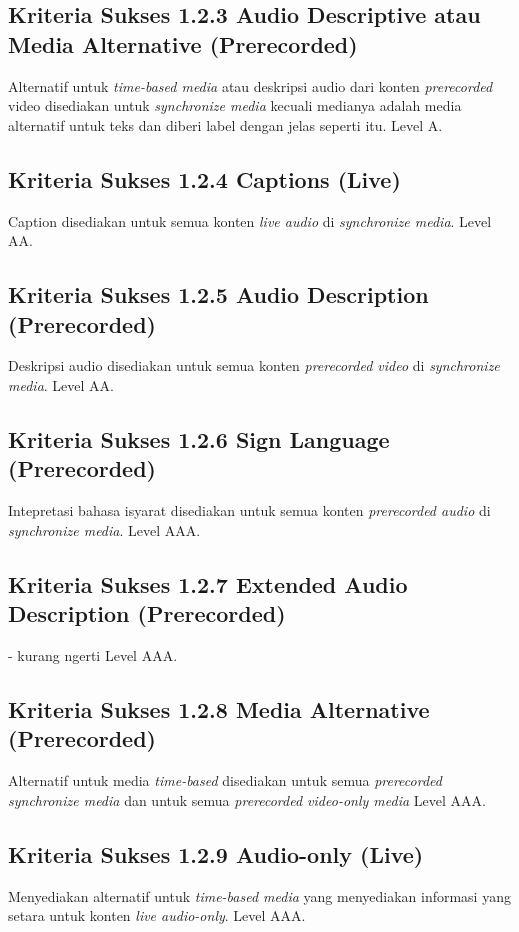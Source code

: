 \subsection{Kriteria Sukses 1.2.3 Audio Descriptive atau Media Alternative (Prerecorded)}
\label{sec:kriteria_1.2.3}
Alternatif untuk \textit{time-based media} atau deskripsi audio dari konten \textit{prerecorded} video disediakan untuk \textit{synchronize media} kecuali medianya adalah media alternatif untuk teks dan diberi label dengan jelas seperti itu.
Level A.

\subsection{Kriteria Sukses 1.2.4 Captions (Live)}
\label{sec:kriteria_1.2.4}
Caption disediakan untuk semua konten \textit{live audio} di \textit{synchronize media}.
Level AA.

\subsection{Kriteria Sukses 1.2.5 Audio Description (Prerecorded)}
\label{sec:kriteria_1.2.5}
Deskripsi audio disediakan untuk semua konten \textit{prerecorded video} di \textit{synchronize media}.
Level AA.

\subsection{Kriteria Sukses 1.2.6 Sign Language (Prerecorded)}
\label{sec:kriteria_1.2.6}
Intepretasi bahasa isyarat disediakan untuk semua konten \textit{prerecorded audio} di \textit{synchronize media}.
Level AAA.

\subsection{Kriteria Sukses 1.2.7 Extended Audio Description (Prerecorded)}
\label{sec:kriteria_1.2.7}
- kurang ngerti
Level AAA.

\subsection{Kriteria Sukses 1.2.8 Media Alternative (Prerecorded)}
\label{sec:kriteria_1.2.8}
Alternatif untuk media \textit{time-based} disediakan untuk semua \textit{prerecorded synchronize media} dan untuk semua \textit{prerecorded video-only media}
Level AAA.

\subsection{Kriteria Sukses 1.2.9 Audio-only (Live)}
\label{sec:kriteria_1.2.9}
Menyediakan alternatif untuk \textit{time-based media} yang menyediakan informasi yang setara untuk konten \textit{live audio-only}.
Level AAA.

